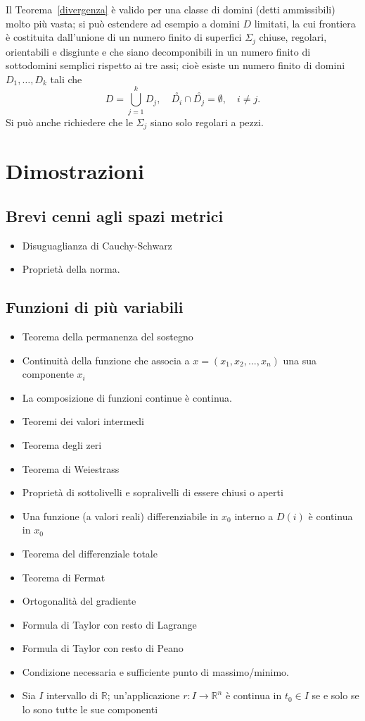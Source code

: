 \documentclass[a4paper]{book}
\numberwithin{equation}{section}
\theoremstyle{plain}
\theoremstyle{definition}
\theoremstyle{remark}
\theoremstyle{example}
\begin{document}
	Il Teorema~\ref{divergenza} è valido per una classe di domini (detti ammissibili) molto più vasta; si può estendere ad esempio a domini $D$ limitati, la cui frontiera è costituita dall'unione di un numero finito di superfici $\Sigma_j$ chiuse, regolari, orientabili e disgiunte e che siano decomponibili in un numero finito di sottodomini semplici rispetto ai tre assi; cioè esiste un numero finito di domini $D_1, \dots, D_k$ tali che
	\begin{equation*}
		D=\bigcup_{j=1}^k D_j, \quad \overset{\circ}{D_i}\cap\overset{\circ}{D_j} = \emptyset, \quad i \ne j.
	\end{equation*}
	Si può anche richiedere che le $\Sigma_j$ siano solo regolari a pezzi.

	\appendix \chapter{Dimostrazioni}
	\section{Brevi cenni agli spazi metrici}
	\begin{itemize}
		\item Disuguaglianza di Cauchy-Schwarz
		\item Proprietà della norma.
	\end{itemize}
	\section{Funzioni di più variabili}
	\begin{itemize}
		\item Teorema della permanenza del sostegno
		\item Continuità della funzione che associa a $x=(x_1,x_2,...,x_n)$ una sua componente $x_i$
		\item La composizione di funzioni continue è continua.
		\item Teoremi dei valori intermedi
		\item Teorema degli zeri
		\item Teorema di Weiestrass
		\item Proprietà di sottolivelli e sopralivelli di essere chiusi o aperti
		\item Una funzione (a valori reali) differenziabile in $x_0$ interno a $D(i)$ è continua in $x_0$
		\item Teorema del differenziale totale
		\item Teorema di Fermat
		\item Ortogonalità del gradiente
		\item Formula di Taylor con resto di Lagrange
		\item Formula di Taylor con resto di Peano
		\item Condizione necessaria e sufficiente punto di massimo/minimo.
			\item Sia $I$ intervallo di $\mathbb{R}$; un'applicazione $r \colon I \to \mathbb{R}^n$ è continua in $t_0 \in I$ se e solo se lo sono tutte le sue componenti
	\end{itemize}
\end{document}
